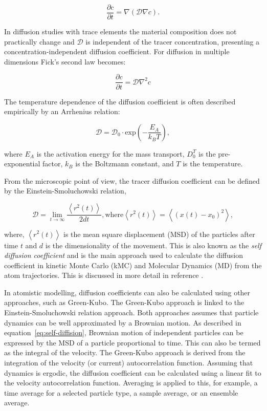 \documentclass[../main.tex]{subfiles}
\begin{document}
\begin{equation}
    \label{eq:ficksecond}
    \frac{\partial c}{\partial t} = \nabla (\mathcal{D} \nabla c ).
\end{equation}

In diffusion studies with trace elements the material composition does not practically change and $\mathcal{D}$ is independent of the tracer concentration, presenting a concentration-independent diffusion coefficient. For diffusion in multiple dimensions Fick's second law becomes: \cite{crank1979mathematics}

\begin{equation}
    \frac{\partial c}{\partial t} = \mathcal{D} \nabla^2 c
    \label{eq:nodirectional_diffusion}
\end{equation}

The temperature dependence of the diffusion coefficient is often described empirically by an Arrhenius relation:

\begin{equation}
    \mathcal{D} = \mathcal{D}_0 \cdot \textrm{exp} \left (- \frac{E_A}{k_B T} \right ),
\end{equation}

where $E_A$ is the activation energy for the mass transport, $D_0^T$ is the pre-exponential factor, $k_B$ is the Boltzmann constant, and $T$ is the temperature.

From the microscopic point of view, the tracer diffusion coefficient can be defined by the Einstein-Smoluchowski relation, \cite{einstein1905presumed,von1906kinetischen}

\begin{equation}
    \mathcal{D} = \lim_{t\to\infty} \frac{\left <r^2(t)\right >}{2dt}, \mathrm{where} \left <r^2(t)\right > = \left< \left(x(t) - x_0 \right)^2 \right>,
    \label{eq:self-diffision}
\end{equation}

where, $\left <r^2(t)\right >$ is the mean square displacement (MSD) of the particles after time $t$ and $d$ is the dimensionality of the movement. This is also known as the \textit{self diffusion coefficient} and is the main approach used to calculate the diffusion coefficient in kinetic Monte Carlo (kMC) and Molecular Dynamics (MD) from the atom trajectories. This is discussed in more detail in reference .

In atomistic modelling, diffusion coefficients can also be calculated using other approaches, such as Green-Kubo. The Green-Kubo approach is linked to the Einstein-Smoluchowski relation approach. Both approaches assumes that particle dynamics can be well approximated by a Brownian motion. As described in equation~\ref{eq:self-diffision}, Brownian motion of independent particles can be expressed by the MSD of a particle proportional to time. This can also be termed as the integral of the velocity. The Green-Kubo approach is derived from the integration of the velocity (or current) autocorrelation function. Assuming that dynamics is ergodic, the diffusion coefficient can be calculated using a linear fit to the velocity autocorrelation function. Averaging is applied to this, for example, a time  average for a selected particle type, a sample average, or an ensemble average.
\end{document}
